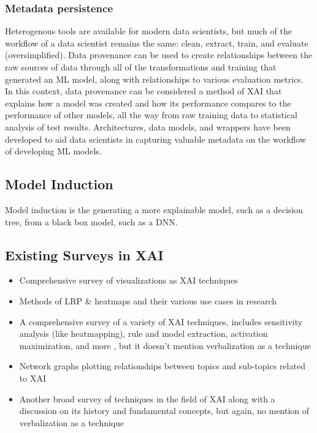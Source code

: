 \documentclass{IEEEtran}
\begin{document}
\subsubsection{Metadata persistence} Heterogenous tools are available for modern data scientists, but much of the workflow of a data scientist remains the same:  clean, extract, train, and evaluate (oversimplified).  Data provenance can be used to create relationships between the raw sources of data through all of the transformations and training that generated an ML model, along with relationships to various evaluation metrics.  In this context, data provenance can be considered a method of XAI that explains how a model was created and how its performance compares to the performance of other models, all the way from raw training data to statistical analysis of test results.  Architectures, data models, and wrappers have been developed to aid data scientists in capturing valuable metadata on the workflow of developing ML models.

\subsection{Model Induction}

Model induction is the generating a more explainable model, such as a decision tree, from a black box model, such as a DNN.

\subsection{Existing Surveys in XAI}

\begin{itemize}
    \item Comprehensive survey of visualizations as XAI techniques \cite{Hohman2018}
    \item Methods of LRP \& heatmaps and their various use cases in research\cite{MONTAVON20181}
    \item A comprehensive survey of a variety of XAI techniques, includes sensitivity analysis (like heatmapping), rule and model extraction, activation maximization, and more \cite{Guidotti:2018:SME:3271482.3236009}, but it doesn't mention verbalization as a technique
    \item Network graphs plotting relationships between topics and sub-topics related to XAI \cite{Abdul:2018:TTE:3173574.3174156}
    \item Another broad survey of techniques in the field of XAI along with a discussion on its history and fundamental concepts, but again, no mention of verbalization as a technique\cite{Adadi2018}
\end{itemize}
\end{document}
